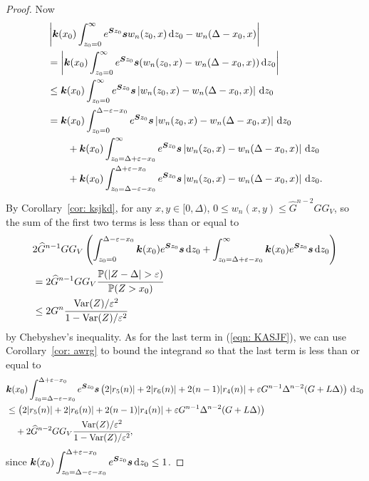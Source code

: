 \begin{proof}
	Now
	\begin{align}
		\nonumber&\left|\boldsymbol k(x_0) \int_{z_0=0}^\infty e^{\boldsymbol Sz_0}\boldsymbol sw_n(z_0,x)\, \mathrm{d} z_0 - w_n(\Delta - x_0,x) \right|
		\\\nonumber&= \left|\boldsymbol k(x_0) \int_{z_0=0}^\infty e^{\boldsymbol Sz_0}\boldsymbol s(w_n(z_0,x) - w_n(\Delta - x_0,x)) \, \mathrm{d} z_0\right|
		\\\nonumber&\leq \boldsymbol k(x_0) \int_{z_0=0}^\infty e^{\boldsymbol Sz_0}\boldsymbol s  \left|w_n(z_0,x) - w_n(\Delta - x_0,x)\right| \, \mathrm{d} z_0
		\\\nonumber&= \boldsymbol k(x_0) \int_{z_0=0}^{\Delta-\varepsilon-x_0} e^{\boldsymbol Sz_0}\boldsymbol s  \left|w_n(z_0,x) - w_n(\Delta - x_0,x)\right| \, \mathrm{d} z_0
		\\\nonumber&\qquad{}+\boldsymbol k(x_0) \int_{z_0=\Delta+\varepsilon-x_0}^\infty e^{\boldsymbol Sz_0}\boldsymbol s  \left|w_n(z_0,x) - w_n(\Delta - x_0,x)\right| \, \mathrm{d} z_0
		\\\label{eqn: KASJF}&\qquad{}+\boldsymbol k(x_0) \int_{z_0=\Delta-\varepsilon-x_0}^{\Delta+\varepsilon-x_0} e^{\boldsymbol Sz_0}\boldsymbol s  \left|w_n(z_0,x) - w_n(\Delta - x_0,x)\right| \, \mathrm{d} z_0.
		\end{align}
		By Corollary~\ref{cor: ksjkd}, for any \(x,y\in [0,\Delta)\), \(0\leq w_n(x,y)\leq \widehat G^{n-2}GG_V\), so the sum of the first two terms is less than or equal to 
		\begin{align}
		&2\widehat G^{n-1}GG_V\left(\int_{z_0=0}^{\Delta-\varepsilon-x_0}\bs k(x_0)e^{\bs S z_0} \bs s \wrt z_0+\int_{z_0=\Delta+\varepsilon-x_0}^\infty \bs k(x_0)e^{\bs S z_0} \bs s \wrt z_0\right)
		\\\nonumber &= 2\widehat G^{n-1}GG_V \cfrac{\mathbb P(|Z-\Delta|> \varepsilon)}{\mathbb P(Z> x_0)}
		\\&\leq 2G^n\cfrac{\var(Z)/\varepsilon^2}{1-\var(Z)/\varepsilon^2}
		\end{align}
		by Chebyshev's inequality. As for the last term in (\ref{eqn: KASJF}), we can use Corollary~\ref{cor: awrg} to bound the integrand so that the last term is less than or equal to 
		\begin{align}
		\nonumber&\boldsymbol k(x_0) \int_{z_0=\Delta-\varepsilon-x_0}^{\Delta+\varepsilon-x_0} e^{\boldsymbol Sz_0}\boldsymbol s \left( 2|r_5(n)| + 2|r_6(n)| + 2(n-1)|r_4(n)| + \varepsilon G^{n-1}\Delta^{n-2}(G+L\Delta) \right) \, \mathrm{d} z_0
		\\\nonumber&\leq  \left( 2|r_5(n)| + 2|r_6(n)| + 2(n-1)|r_4(n)| + \varepsilon G^{n-1}\Delta^{n-2}(G+L\Delta) \right)
		\\&\quad{}+2\widehat G^{n-2}GG_V\cfrac{\mathrm{Var}(Z)/\varepsilon^2}{1-\mathrm{Var}(Z)/\varepsilon^2} ,
	\end{align}
	since \(\displaystyle \boldsymbol k(x_0) \int_{z_0=\Delta-\varepsilon-x_0}^{\Delta+\varepsilon-x_0} e^{\boldsymbol Sz_0}\boldsymbol s\, \mathrm{d} z_0\leq 1\). 
\end{proof}

